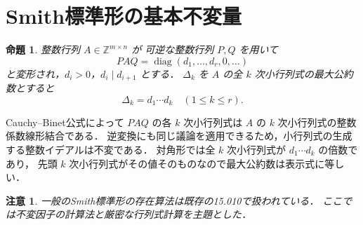 \documentclass[a5paper,10pt,onecolumn]{jsarticle}
\makeatletter
\theoremstyle{mathnotetheorem}
\newtheorem{proposition}[theorem]{命題}
\newtheorem{remark}[theorem]{注意}
\renewcommand{\proofname}{証明}
\renewenvironment{proof}[1][\proofname]{%
  \par\pushQED{\qed}\normalfont\topsep4\p@\@plus2\p@\relax
  \trivlist\item[\hskip\labelsep\bfseries #1]\ignorespaces
}{\popQED\endtrivlist\@endpefalse}
\makeatother
\begin{document}
\section{Smith標準形の基本不変量}
\begin{proposition}
整数行列 $A\in\mathbb Z^{m\times n}$ が
可逆な整数行列 $P,Q$ を用いて
\[
 PAQ=\operatorname{diag}(d_1,\ldots,d_r,0,\ldots)
\]
と変形され，$d_i>0$，$d_i\mid d_{i+1}$ とする．
$\Delta_k$ を $A$ の全 $k$ 次小行列式の最大公約数とすると
\[\Delta_k=d_1\cdots d_k\quad(1\le k\le r).\]
\end{proposition}
\begin{proof}
Cauchy--Binet公式によって $PAQ$ の各 $k$ 次小行列式は
$A$ の $k$ 次小行列式の整数係数線形結合である．
逆変換にも同じ議論を適用できるため，小行列式の生成する整数イデアルは不変である．
対角形では全 $k$ 次小行列式が $d_1\cdots d_k$ の倍数であり，
先頭 $k$ 次小行列式がその値そのものなので最大公約数は表示式に等しい．
\end{proof}
\begin{remark}
一般のSmith標準形の存在算法は既存の15.010で扱われている．
ここでは不変因子の計算法と厳密な行列式計算を主題とした．
\end{remark}
\end{document}
